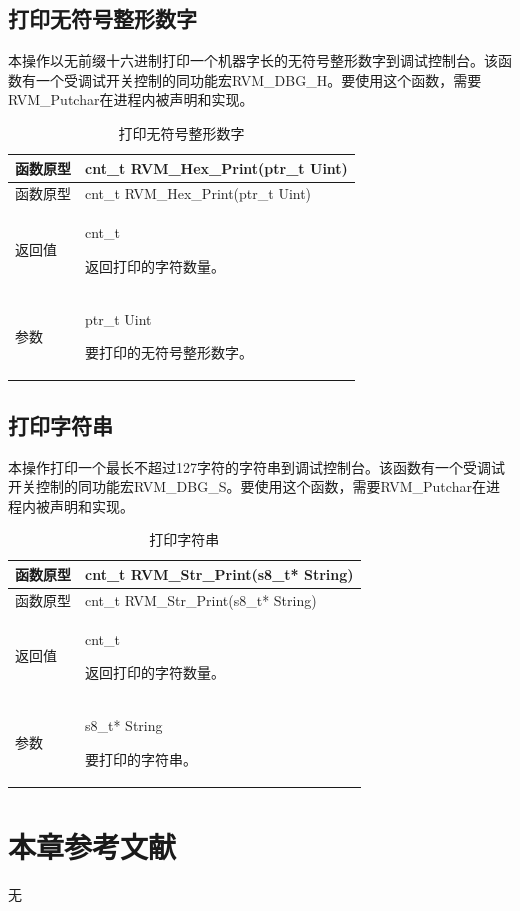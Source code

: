 \subsection{打印无符号整形数字}\label{subsec:3-6-7}

本操作以无前缀十六进制打印一个机器字长的无符号整形数字到调试控制台。该函数有一个受调试开关控制的同功能宏RVM\_DBG\_H。要使用这个函数，需要RVM\_Putchar在进程内被声明和实现。

\begin{xltabular}{\textwidth}{@{}>{\hsize\raggedright\arraybackslash}X>{\hsize\raggedright\arraybackslash}X@{}}
\caption{打印无符号整形数字}\label{tab:3-20}\\
\toprule
函数原型 & cnt\_\allowbreak{}t RVM\_\allowbreak{}Hex\_\allowbreak{}Print(ptr\_\allowbreak{}t Uint)\tabularnewline
\endfirsthead
\toprule
函数原型 & cnt\_\allowbreak{}t RVM\_\allowbreak{}Hex\_\allowbreak{}Print(ptr\_\allowbreak{}t Uint)\tabularnewline
\midrule
\endhead
\bottomrule
\endlastfoot
返回值\strut
 & cnt\_\allowbreak{}t

返回打印的字符数量。\strut
\tabularnewline
参数\strut
 & ptr\_\allowbreak{}t Uint

要打印的无符号整形数字。\strut
\tabularnewline
\end{xltabular}

\subsection{打印字符串}\label{subsec:3-6-8}

本操作打印一个最长不超过127字符的字符串到调试控制台。该函数有一个受调试开关控制的同功能宏RVM\_DBG\_S。要使用这个函数，需要RVM\_Putchar在进程内被声明和实现。

\begin{xltabular}{\textwidth}{@{}>{\hsize\raggedright\arraybackslash}X>{\hsize\raggedright\arraybackslash}X@{}}
\caption{打印字符串}\label{tab:3-21}\\
\toprule
函数原型 & cnt\_\allowbreak{}t RVM\_\allowbreak{}Str\_\allowbreak{}Print(s8\_\allowbreak{}t* String)\tabularnewline
\endfirsthead
\toprule
函数原型 & cnt\_\allowbreak{}t RVM\_\allowbreak{}Str\_\allowbreak{}Print(s8\_\allowbreak{}t* String)\tabularnewline
\midrule
\endhead
\bottomrule
\endlastfoot
返回值\strut
 & cnt\_\allowbreak{}t

返回打印的字符数量。\strut
\tabularnewline
参数\strut
 & s8\_\allowbreak{}t* String

要打印的字符串。\strut
\tabularnewline
\end{xltabular}

\section{本章参考文献}\label{sec:3-7}

无

